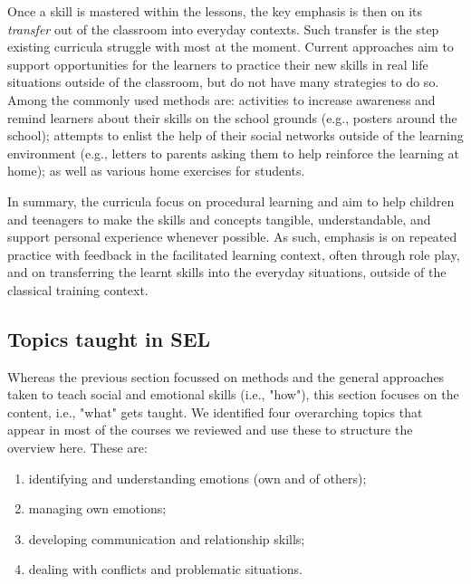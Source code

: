 \documentclass[prodmode,acmtochi]{acmsmall}
\begin{document}
Once a skill is mastered within the lessons, the key emphasis is then on its \emph{transfer} out of the classroom into everyday contexts. Such transfer is the step existing curricula struggle with most at the moment. Current approaches aim to support opportunities for the learners to practice their new skills in real life situations outside of the classroom, but do not have many strategies to do so. Among the commonly used methods are: activities to increase awareness and remind learners about their skills on the school grounds (e.g., posters around the school); attempts to enlist the help of their social networks outside of the learning environment (e.g., letters to parents asking them to help reinforce the learning at home); as well as various home exercises for students. %
        
In summary, the curricula focus on procedural learning and aim to help children and teenagers to make the skills and concepts tangible, understandable, and support personal experience whenever possible. As such, emphasis is on repeated practice with feedback in the facilitated learning context, often through role play, and on transferring the learnt skills into the everyday situations, outside of the classical training context. 

\subsection{Topics taught in SEL}
\label{sec:blocks}

Whereas the previous section focussed on methods and the general approaches taken to teach social and emotional skills (i.e., "how"), this section focuses on the content, i.e., "what" gets taught. %
%
We identified four overarching topics that appear in most of the courses we reviewed and use these to structure the overview here. These are:  
\begin{enumerate}
        \item identifying and understanding emotions (own and of others);
        \item managing own emotions;
        \item developing communication and relationship skills;
        \item dealing with conflicts and problematic situations.
\end{enumerate}
\end{document}
